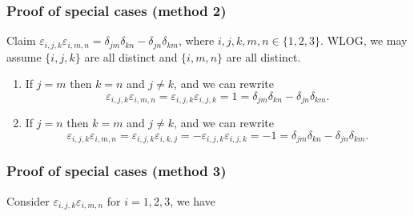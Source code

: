 \documentclass[12pt]{article}
\begin{document}
\subsubsection{Proof of special cases (method 2)}
Claim $\varepsilon_{i,j,k}\varepsilon_{i,m,n} = \delta_{jm}\delta_{kn} - \delta_{jn}\delta_{km}$, where $i,j,k,m,n\in\{1,2,3\}$. WLOG, we may assume $\{i,j,k\}$ are all distinct and $\{i,m,n\}$ are all distinct.
\begin{enumerate}

\item If $j=m$ then $k=n$ and $j\neq k$, and we can rewrite
\begin{equation}
\varepsilon_{i,j,k}\varepsilon_{i,m,n} = \varepsilon_{i,j,k}\varepsilon_{i,j,k} = 1 = \delta_{jm}\delta_{kn} - \delta_{jn}\delta_{km}.
\end{equation}

\item If $j=n$ then $k=m$ and $j\neq k$, and we can rewrite 
\begin{equation}
\varepsilon_{i,j,k}\varepsilon_{i,m,n} = \varepsilon_{i,j,k}\varepsilon_{i,k,j} = -\varepsilon_{i,j,k}\varepsilon_{i,j,k} = -1 = \delta_{jm}\delta_{kn} - \delta_{jn}\delta_{km}.
\end{equation}
\end{enumerate}


\newpage
\subsubsection{Proof of special cases (method 3)} 
Consider $\varepsilon_{i,j,k}\varepsilon_{i,m,n}$ for $i=1,2,3$, we have 
\end{document}

